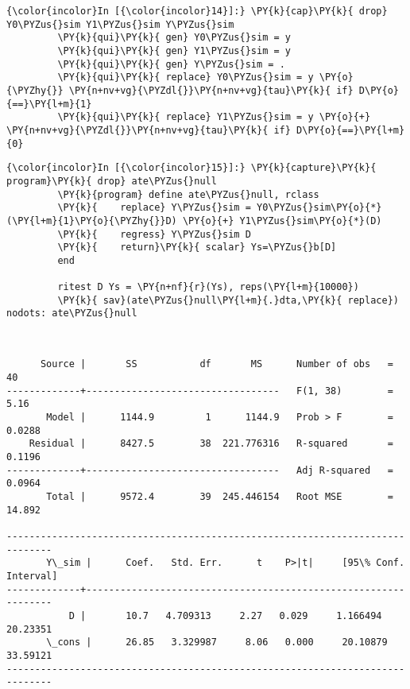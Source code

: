 \documentclass[11pt,notitlepage]{article}\usepackage[]{graphicx}\usepackage[]{color}
\makeatletter
\newenvironment{kframe}{%
 \def\at@end@of@kframe{}%
 \ifinner\ifhmode%
  \def\at@end@of@kframe{\end{minipage}}%
  \begin{minipage}{\columnwidth}%
 \fi\fi%
 \def\FrameCommand##1{\hskip\@totalleftmargin \hskip-\fboxsep
 \colorbox{shadecolor}{##1}\hskip-\fboxsep
     \hskip-\linewidth \hskip-\@totalleftmargin \hskip\columnwidth}%
 \MakeFramed {\advance\hsize-\width
   \@totalleftmargin\z@ \linewidth\hsize
   \@setminipage}}%
 {\par\unskip\endMakeFramed%
 \at@end@of@kframe}
\newenvironment{knitrout}{}{} %
\makeatother
\begin{document}
\begin{enumerate}[a)]
\begin{knitrout}
\color{fgcolor}\begin{kframe}
    \begin{Verbatim}[commandchars=\\\{\}]
{\color{incolor}In [{\color{incolor}14}]:} \PY{k}{cap}\PY{k}{ drop} Y0\PYZus{}sim Y1\PYZus{}sim Y\PYZus{}sim
         \PY{k}{qui}\PY{k}{ gen} Y0\PYZus{}sim = y
         \PY{k}{qui}\PY{k}{ gen} Y1\PYZus{}sim = y
         \PY{k}{qui}\PY{k}{ gen} Y\PYZus{}sim = .
         \PY{k}{qui}\PY{k}{ replace} Y0\PYZus{}sim = y \PY{o}{\PYZhy{}} \PY{n+nv+vg}{\PYZdl{}}\PY{n+nv+vg}{tau}\PY{k}{ if} D\PY{o}{==}\PY{l+m}{1}
         \PY{k}{qui}\PY{k}{ replace} Y1\PYZus{}sim = y \PY{o}{+} \PY{n+nv+vg}{\PYZdl{}}\PY{n+nv+vg}{tau}\PY{k}{ if} D\PY{o}{==}\PY{l+m}{0}
\end{Verbatim}

    \begin{Verbatim}[commandchars=\\\{\}]
{\color{incolor}In [{\color{incolor}15}]:} \PY{k}{capture}\PY{k}{ program}\PY{k}{ drop} ate\PYZus{}null
         \PY{k}{program} define ate\PYZus{}null, rclass
         \PY{k}{	replace} Y\PYZus{}sim = Y0\PYZus{}sim\PY{o}{*}(\PY{l+m}{1}\PY{o}{\PYZhy{}}D) \PY{o}{+} Y1\PYZus{}sim\PY{o}{*}(D) 
         \PY{k}{	regress} Y\PYZus{}sim D 
         \PY{k}{    return}\PY{k}{ scalar} Ys=\PYZus{}b[D]	
         end
         
         ritest D Ys = \PY{n+nf}{r}(Ys), reps(\PY{l+m}{10000})
         \PY{k}{ sav}(ate\PYZus{}null\PY{l+m}{.}dta,\PY{k}{ replace}) nodots: ate\PYZus{}null
\end{Verbatim}

    \begin{Verbatim}[commandchars=\\\{\}]


      Source |       SS           df       MS      Number of obs   =        40
-------------+----------------------------------   F(1, 38)        =      5.16
       Model |      1144.9         1      1144.9   Prob > F        =    0.0288
    Residual |      8427.5        38  221.776316   R-squared       =    0.1196
-------------+----------------------------------   Adj R-squared   =    0.0964
       Total |      9572.4        39  245.446154   Root MSE        =    14.892

------------------------------------------------------------------------------
       Y\_sim |      Coef.   Std. Err.      t    P>|t|     [95\% Conf. Interval]
-------------+----------------------------------------------------------------
           D |       10.7   4.709313     2.27   0.029     1.166494    20.23351
       \_cons |      26.85   3.329987     8.06   0.000     20.10879    33.59121
------------------------------------------------------------------------------


\end{Verbatim}
\end{kframe}
\end{knitrout}
\end{enumerate}
\end{document}

